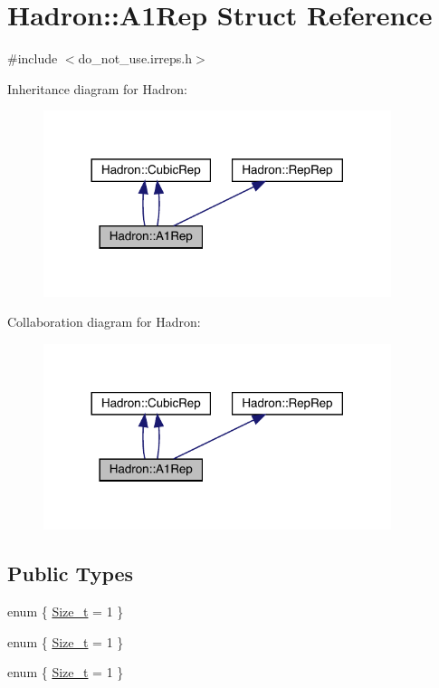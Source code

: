 \hypertarget{structHadron_1_1A1Rep}{}\section{Hadron\+:\+:A1\+Rep Struct Reference}
\label{structHadron_1_1A1Rep}


{\ttfamily \#include $<$do\+\_\+not\+\_\+use.\+irreps.\+h$>$}



Inheritance diagram for Hadron\+:\nopagebreak
\begin{figure}[H]
\begin{center}
\leavevmode
\includegraphics[width=288pt]{d7/dde/structHadron_1_1A1Rep__inherit__graph}
\end{center}
\end{figure}


Collaboration diagram for Hadron\+:\nopagebreak
\begin{figure}[H]
\begin{center}
\leavevmode
\includegraphics[width=288pt]{dd/de0/structHadron_1_1A1Rep__coll__graph}
\end{center}
\end{figure}
\subsection*{Public Types}
\begin{DoxyCompactItemize}
\item 
enum \{ \mbox{\hyperlink{structHadron_1_1A1Rep_a665dc3d5fcc68d8415b29e7b45107036a7aff2e8085a1de8589bd14144e70a564}{Size\+\_\+t}} = 1
 \}
\item 
enum \{ \mbox{\hyperlink{structHadron_1_1A1Rep_a665dc3d5fcc68d8415b29e7b45107036a7aff2e8085a1de8589bd14144e70a564}{Size\+\_\+t}} = 1
 \}
\item 
enum \{ \mbox{\hyperlink{structHadron_1_1A1Rep_a665dc3d5fcc68d8415b29e7b45107036a7aff2e8085a1de8589bd14144e70a564}{Size\+\_\+t}} = 1
 \}
\end{DoxyCompactItemize}
